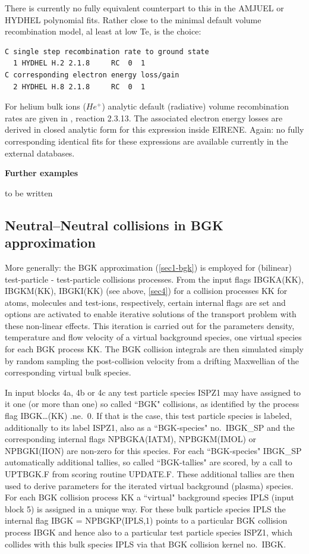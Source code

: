There is currently no fully equivalent counterpart to this in the AMJUEL or
HYDHEL polynomial fits.
Rather close to the minimal default volume recombination model, al least at low
Te, is the choice:

\begin{lstlisting}
C single step recombination rate to ground state
  1 HYDHEL H.2 2.1.8     RC  0  1
C corresponding electron energy loss/gain
  2 HYDHEL H.8 2.1.8     RC  0  1
\end{lstlisting}

For helium bulk ions ($He^+$) analytic default (radiative) volume recombination
rates are given in \cite{kn:Janev}, reaction 2.3.13.
The associated electron energy losses are derived in closed analytic form for
this expression inside EIRENE.
Again: no fully corresponding identical fits for these expressions are
available currently in the external databases.

\textbf{Further examples} 

to be written 

\subsection{Neutral--Neutral collisions in \ac{BGK} approximation}\label{sec4-bgk} 

More generally: the \ac{BGK} approximation (\cref{sec1-bgk}) is employed for
(bilinear) test-particle  -  test-particle collisions processes.
From the input flags IBGKA(KK), IBGKM(KK), IBGKI(KK) (see above, \cref{sec4})
for a collision processes KK for atoms, molecules and test-ions, respectively,
certain internal flags are set and options are activated to enable iterative
solutions of the transport problem with these non-linear effects.
This iteration is carried out for the parameters density, temperature and flow
velocity of a virtual background species, one virtual species for each \ac{BGK}
process KK.
The \ac{BGK} collision integrals are then simulated simply by random sampling
the post-collision velocity from a drifting Maxwellian of the corresponding
virtual bulk species.

In input blocks 4a, 4b or 4c any test particle species ISPZ1 may have assigned
to it one (or more than one) so called ``\acs{BGK}" collisions, as identified
by the process flag IBGK\dots(KK) .ne.\ 0.
If that is the case, this test particle species is labeled, additionally to its
label ISPZ1, also as a ``\acs{BGK}-species" no.\ IBGK\_SP and the corresponding
internal flags NPBGKA(IATM), NPBGKM(IMOL) or NPBGKI(IION) are non-zero for this
species.
For each ``\acs{BGK}-species" IBGK\_SP automatically additional tallies, so
called ``\acs{BGK}-tallies" are scored, by a call to UPTBGK.F from scoring
routine UPDATE.F.
These additional tallies are then used to derive parameters for the iterated
virtual background (plasma) species.
For each \ac{BGK} collision process KK a ``virtual" background species IPLS
(input block 5) is assigned in a unique way.
For these bulk particle species IPLS the internal flag IBGK = NPBGKP(IPLS,1)
points to a particular \acs{BGK} collision process IBGK and hence also to a
particular test particle species ISPZ1, which collides with this bulk species
IPLS via that \acs{BGK} collision kernel no.\ IBGK.

